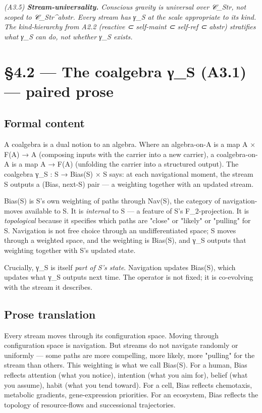\documentclass[11pt, openany]{book}
\newcommand{\sectionbreak}{\clearpage}
\begin{document}
\textit{(A3.5) \textbf{Stream-universality.} Conscious gravity is universal over 𝒞\_\allowbreak{}Str, not scoped to 𝒞\_\allowbreak{}Str\textasciicircum{}abstr. Every stream has γ\_\allowbreak{}S at the scale appropriate to its kind. The kind-hierarchy from A2.2 (reactive ⊂ self-maint ⊂ self-ref ⊂ abstr) stratifies what γ\_\allowbreak{}S can do, not whether γ\_\allowbreak{}S exists.}

\sectionbreak

\section{§4.2 --- The coalgebra γ\_\allowbreak{}S (A3.1) --- paired prose}

\subsection{Formal content}

A coalgebra is a dual notion to an algebra. Where an algebra-on-A is a map A × F(A) → A (composing inputs with the carrier into a new carrier), a coalgebra-on-A is a map A → F(A) (unfolding the carrier into a structured output). The coalgebra γ\_\allowbreak{}S : S → Bias(S) × S says: at each navigational moment, the stream S outputs a (Bias, next-S) pair --- a weighting together with an updated stream.

Bias(S) is S's own weighting of paths through Nav(S), the category of navigation-moves available to S. It is \textit{internal} to S --- a feature of S's F\_\allowbreak{}2-projection. It is \textit{topological} because it specifies which paths are "close" or "likely" or "pulling" for S. Navigation is not free choice through an undifferentiated space; S moves through a weighted space, and the weighting is Bias(S), and γ\_\allowbreak{}S outputs that weighting together with S's updated state.

Crucially, γ\_\allowbreak{}S is itself \textit{part of S's state}. Navigation updates Bias(S), which updates what γ\_\allowbreak{}S outputs next time. The operator is not fixed; it is co-evolving with the stream it describes.

\subsection{Prose translation}

Every stream moves through its configuration space. Moving through configuration space is navigation. But streams do not navigate randomly or uniformly --- some paths are more compelling, more likely, more "pulling" for the stream than others. This weighting is what we call Bias(S). For a human, Bias reflects attention (what you notice), intention (what you aim for), belief (what you assume), habit (what you tend toward). For a cell, Bias reflects chemotaxis, metabolic gradients, gene-expression priorities. For an ecosystem, Bias reflects the topology of resource-flows and successional trajectories.
\end{document}
